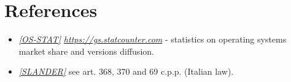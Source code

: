 \documentclass[a4paper]{report}
\begin{document}
\chapter{References}
\begin{itemize}

\item \label{ref:os-stats} \hyperref[use:os-stats]{\textit{[OS-STAT]}} \href{https://gs.statcounter.com}{\textit{https://gs.statcounter.com}} - statistics on operating systems market share and versions diffusion.

\item \label{ref:slander} \hyperref[use:slander]{\textit{[SLANDER]}} see art. 368, 370 and 69 c.p.p. (Italian law).


\end{itemize}
\end{document}
